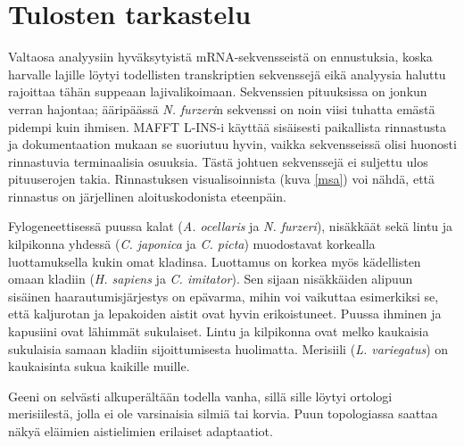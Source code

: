 \documentclass[a4paper,11pt,notitlepage]{article}
\begin{document}
\section{Tulosten tarkastelu}
Valtaosa analyysiin hyväksytyistä mRNA-sekvensseistä on ennustuksia, koska harvalle lajille löytyi todellisten transkriptien sekvenssejä eikä analyysia haluttu rajoittaa tähän suppeaan lajivalikoimaan. Sekvenssien pituuksissa on jonkun verran hajontaa; ääripäässä \textit{N. furzeri}n sekvenssi on noin viisi tuhatta emästä pidempi kuin ihmisen. MAFFT L-INS-i käyttää sisäisesti paikallista rinnastusta ja dokumentaation mukaan se suoriutuu hyvin, vaikka sekvensseissä olisi huonosti rinnastuvia terminaalisia osuuksia. Tästä johtuen sekvenssejä ei suljettu ulos pituuserojen takia. Rinnastuksen visualisoinnista (kuva \ref{msa}) voi nähdä, että rinnastus on järjellinen aloituskodonista eteenpäin.

Fylogeneettisessä puussa kalat (\textit{A. ocellaris} ja \textit{N. furzeri}), nisäkkäät sekä lintu ja kilpikonna yhdessä (\textit{C. japonica} ja \textit{C. picta}) muodostavat korkealla luottamuksella kukin omat kladinsa. Luottamus on korkea myös kädellisten omaan kladiin (\textit{H. sapiens} ja \textit{C. imitator}). Sen sijaan nisäkkäiden alipuun sisäinen haarautumisjärjestys on epävarma, mihin voi vaikuttaa esimerkiksi se, että kaljurotan ja lepakoiden aistit ovat hyvin erikoistuneet. Puussa ihminen ja kapusiini ovat lähimmät sukulaiset. Lintu ja kilpikonna ovat melko kaukaisia sukulaisia samaan kladiin sijoittumisesta huolimatta. Merisiili (\textit{L. variegatus}) on kaukaisinta sukua kaikille muille.

Geeni on selvästi alkuperältään todella vanha, sillä sille löytyi ortologi merisiilestä, jolla ei ole varsinaisia silmiä tai korvia. Puun topologiassa saattaa näkyä eläimien aistielimien erilaiset adaptaatiot. 

\printbibliography[title={Kirjallisuusluettelo}]
\end{document}
